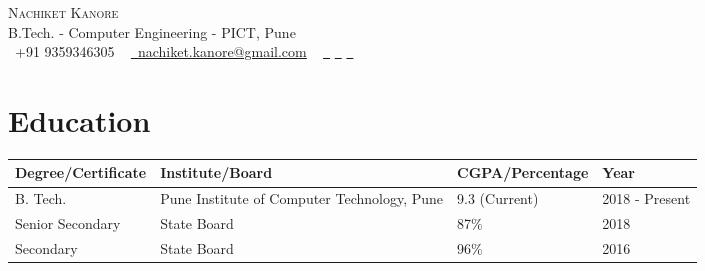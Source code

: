 \documentclass[letterpaper,11pt]{article}
\begin{document}

\begin{center}
    {\Huge \scshape Nachiket Kanore} \\ \vspace{1pt}
    B.Tech. - Computer Engineering - PICT, Pune \\ \vspace{1pt}
    \small \raisebox{-0.1\height}\faPhone\ +91 9359346305 ~ \href{mailto:nachiket.kanore@gmail.com}{\raisebox{-0.2\height}\faEnvelope\  \underline{nachiket.kanore@gmail.com}} ~ 
    \href{https://linkedin.com/in/nachiketkanore}{\raisebox{-0.2\height}\faLinkedin\ \underline{}}
    \href{https://github.com/nachiketkanore}{\raisebox{-0.2\height}\faGithub\ \underline{}}
    \href{https://twitter.com/nachiket_kanore}{\raisebox{-0.2\height}\faTwitter\ \underline{}}
    \vspace{-8pt}
\end{center}


\section{Education}

\begin{tabular}{ |p{4cm}|p{8.2cm}|p{4cm}|p{3.1cm}|  }

 \hline
 \hfil \textbf{Degree/Certificate} & \hfil \textbf{Institute/Board} & \hfil \textbf{CGPA/Percentage} & \hfil \textbf{Year}\\
 \hline
 \hfil {\footnotesize B. Tech.} & \hfil {\footnotesize Pune Institute of Computer Technology, Pune} & \hfil {\footnotesize 9.3 (Current)}& \hfil {\footnotesize 2018 - Present}\\
 \hfil {\footnotesize Senior Secondary} & \hfil {\footnotesize State Board}  & \hfil {\footnotesize 87\%} & \hfil {\footnotesize 2018}\\
 \hfil {\footnotesize Secondary} & \hfil {\footnotesize State Board}  & \hfil {\footnotesize 96\%} & \hfil {\footnotesize 2016}\\
 \hline
\end{tabular}
\end{document}
